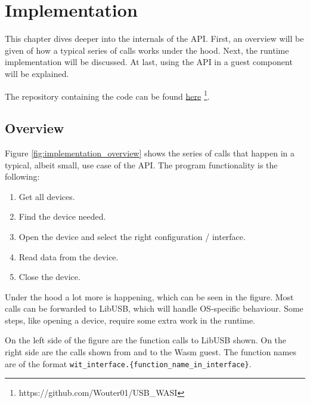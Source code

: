 \chapter{Implementation}
\label{chapter:implementation}
This chapter dives deeper into the internals of the API. First, an overview will be given of how a typical series of calls works under the hood. Next, the runtime implementation will be discussed. At last, using the \acrshort{API} in a guest component will be explained.

The repository containing the code can be found \href{https://github.com/Wouter01/USB_WASI}{here} \footnote{https://github.com/Wouter01/USB\_WASI}.

\section{Overview}

Figure \ref{fig:implementation_overview} shows the series of calls that happen in a typical, albeit small, use case of the API. The program functionality is the following:
\begin{enumerate}
\item Get all devices.
\item Find the device needed.
\item Open the device and select the right configuration / interface.
\item Read data from the device.
\item Close the device.
\end{enumerate}

Under the hood a lot more is happening, which can be seen in the figure. Most calls can be forwarded to LibUSB, which will handle OS-specific behaviour. Some steps, like opening a device, require some extra work in the runtime.

On the left side of the figure are the function calls to LibUSB shown. On the right side are the calls shown from and to the \acrshort{Wasm} guest. The function names are of the format \texttt{wit\_interface.\{function\_name\_in\_interface\}}.

